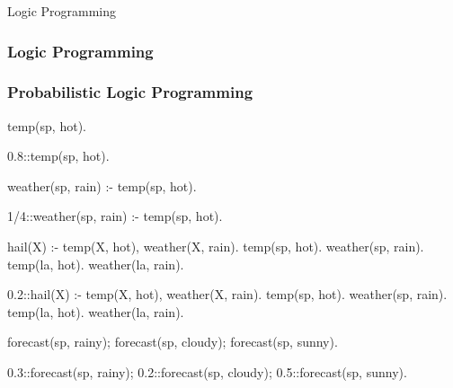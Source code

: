\documentclass[aspectratio=169]{beamer}
\begin{document}

\begin{frame}[fragile]{Logic Programming}
\frametitle<1>{Logic Programming}
\frametitle<2>{Probabilistic Logic Programming}
\begin{overprint}
\begin{pasp}
temp(sp, hot).
\end{pasp}
\begin{pasp}
0.8::temp(sp, hot).
\end{pasp}
\end{overprint}
\vspace{0.5cm}
\begin{overprint}
\begin{pasp}
weather(sp, rain) :- temp(sp, hot).
\end{pasp}
\begin{pasp}
1/4::weather(sp, rain) :- temp(sp, hot).
\end{pasp}
\end{overprint}
\vspace{0.5cm}
\begin{overprint}
\begin{pasp}
hail(X) :- temp(X, hot), weather(X, rain).
temp(sp, hot). weather(sp, rain). %
temp(la, hot). weather(la, rain). %
\end{pasp}
\begin{pasp}
0.2::hail(X) :- temp(X, hot), weather(X, rain).
temp(sp, hot). weather(sp, rain). %
temp(la, hot). weather(la, rain). %
\end{pasp}
\end{overprint}
\vspace{0.5cm}
\begin{overprint}
\begin{pasp}
forecast(sp, rainy); forecast(sp, cloudy); forecast(sp, sunny).
\end{pasp}
\begin{pasp}
0.3::forecast(sp, rainy); 0.2::forecast(sp, cloudy); 0.5::forecast(sp, sunny).
\end{pasp}
\end{overprint}
\end{frame}
\end{document}

